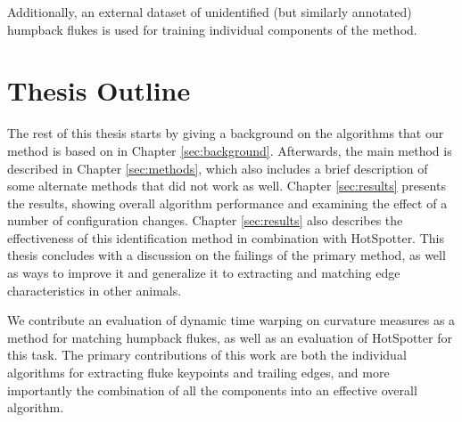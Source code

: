 
Additionally, an external dataset of unidentified (but similarly annotated) humpback flukes is used for training individual components of the method.


\section{Thesis Outline}


The rest of this thesis starts by giving a background on the algorithms that our method is based on in Chapter \ref{sec:background}.
Afterwards, the main method is described in Chapter \ref{sec:methods}, which also includes a brief description of some alternate methods that did not work as well.
Chapter \ref{sec:results} presents the results, showing overall algorithm performance and examining the effect of a number of configuration changes.
Chapter \ref{sec:results} also describes the effectiveness of this identification method in combination with HotSpotter.
This thesis concludes with a discussion on the failings of the primary method, as well as ways to improve it and generalize it to extracting and matching edge characteristics in other animals.

We contribute an evaluation of dynamic time warping on curvature measures as a method for matching humpback flukes, as well as an evaluation of HotSpotter for this task.
The primary contributions of this work are both the individual algorithms for extracting fluke keypoints and trailing edges, and more importantly the combination of all the components into an effective overall algorithm.







